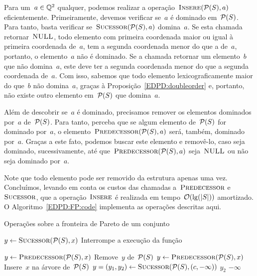 Para um~${ a \in \mathbb{Q}^2 }$ qualquer, podemos realizar a operação~$\textsc{Insere}(\mathcal{P}(S),a)$ eficientemente. Primeiramente, devemos verificar se~$a$ é dominado em~$\mathcal{P}(S)$. Para tanto, basta verificar se~$\textsc{Sucessor}(\mathcal{P}(S),a)$ domina~$a$. Se esta chamada retornar~$\textsc{NULL}$, todo elemento com primeira coordenada maior ou igual à primeira coordenada de~$a$, tem a segunda coordenada menor do que a de~$a$, portanto, o elemento~$a$ não é dominado. Se a chamada retornar um elemento~$b$ que não domina~$a$, este deve ter a segunda coordenada menor do que a segunda coordenada de~$a$. Com isso, sabemos que todo elemento lexicograficamente maior do que~$b$ não domina~$a$, graças à Proposição~\ref{EDPD:doubleorder} e, portanto, não existe outro elemento em~$\mathcal{P}(S)$ que domina~$a$.

Além de descobrir se~$a$ é dominado, precisamos remover os elementos dominados por~$a$ de~$\mathcal{P}(S)$. Para tanto, perceba que se algum elemento de~$\mathcal{P}(S)$ for dominado por~$a$, o elemento~$\textsc{Predecessor}(\mathcal{P}(S),a)$ será, também, dominado por~$a$. Graças a este fato, podemos buscar este elemento e removê-lo, caso seja dominado, sucessivamente, até que~$\textsc{Predecessor}(\mathcal{P}(S),a)$ seja~$\textsc{NULL}$ ou não seja dominado por~$a$.

Note que todo elemento pode ser removido da estrutura apenas uma vez. Concluímos, levando em conta os custos das chamadas a~$\textsc{Predecessor}$ e~$\textsc{Sucessor}$, que a operação~$\textsc{Insere}$ é realizada em tempo~$\mathcal{O}(\lg(|S|))$ amortizado. O Algoritmo~\ref{EDPD:FP:code} implementa as operações descritas aqui. 

\begin{algorithm}[h]
\caption{Operações sobre a fronteira de Pareto de um conjunto}
\label{EDPD:FP:code}
\begin{algorithmic}[1]
    \State $y \leftarrow \textsc{Sucessor}(\mathcal{P}(S),x)$
        \State Interrompe a execução da função
    \EndIf

    \State $y \leftarrow \textsc{Predecessor}(\mathcal{P}(S),x)$
        \State Remove~$y$ de~$\mathcal{P}(S)$
        \State $y \leftarrow \textsc{Predecessor}(\mathcal{P}(S),x)$
    \EndWhile
    \State Insere~$x$ na árvore de~$\mathcal{P}(S)$
\EndFunction
{}
    \State $y = (y_1,y_2) \leftarrow \textsc{Sucessor}(\mathcal{P}(S),(c,-\infty))$
        \State \Return $y_2$
    \Else
        \State \Return $-\infty$
    \EndIf
\EndFunction
\end{algorithmic}
\end{algorithm}

